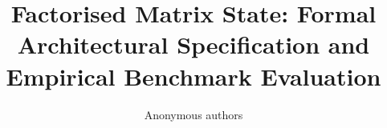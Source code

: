 \title{\textbf{Factorised Matrix State: Formal Architectural Specification and Empirical Benchmark Evaluation}}

\author{Anonymous authors}

